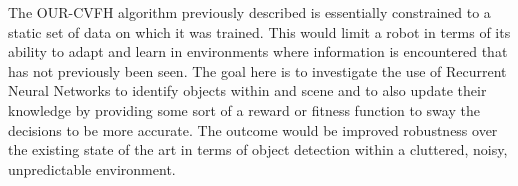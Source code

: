 The OUR-CVFH algorithm previously described is essentially constrained to a static set of data on which it was trained. This would limit a robot in terms of its ability to adapt and learn in environments where information is encountered that has not previously been seen. The goal here is to investigate the use of Recurrent Neural Networks to identify objects within and scene and to also update their knowledge by providing some sort of a reward or fitness function to sway the decisions to be more accurate. The outcome would be improved robustness over the existing state of the art in terms of object detection within a cluttered, noisy, unpredictable environment. 